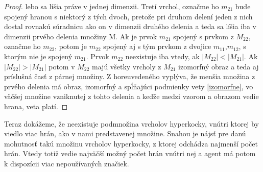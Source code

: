 \begin{proof}
lebo sa líšia práve v jednej dimenzii. Tretí vrchol, označme ho $m_{21}$
 bude spojený hranou s
niektorý z tých dvoch, pretože pri druhom delení jeden z nich dostal rovnakú
súradnicu ako on v dimenzii druhého delenia a teda sa líšia iba v dimenzii
prvého delenia množiny M. Ak je prvok $m_{21}$ spojený s prvkom z
$M_{22}$, označme ho $m_{22}$, potom je $m_{22}$ spojený aj s tým prvkom
z dvojice $m_{11}$,$m_{12}$, s ktorým nie je spojený $m_{21}$.
Prvok $m_{22}$ neexistuje iba vtedy, ak $|M_{22}|<|M_{21}|$. 
Ak $|M_{22}|>|M_{21}|$ potom v $M_{22}$ majú všetky vrcholy z $M_{21}$
izomorfný obraz a teda aj príslušná časť z párnej množiny.
Z horeuvedeného vyplýva, že menšia množina z prvého delenia má obraz,
izomorfný a spĺňajúci podmienky vety \ref{izomorfne}, 
vo väčšej množine vzniknutej z tohto delenia a keďže 
medzi vzorom a obrazom vedie hrana, veta platí.
\end{proof}

Teraz dokážeme, že neexistuje podmnožina vrcholov hyperkocky, vnútri ktorej
by viedlo viac hrán, ako v nami predstavenej množine. Snahou je nájsť pre
danú mohutnosť takú množinu vrcholov hyperkocky, z ktorej odchádza najmenší
počet hrán. Vtedy totiž vedie najväčší možný počet hrán vnútri nej a agent
má potom k dispozícii viac nepoužívaných značiek.

